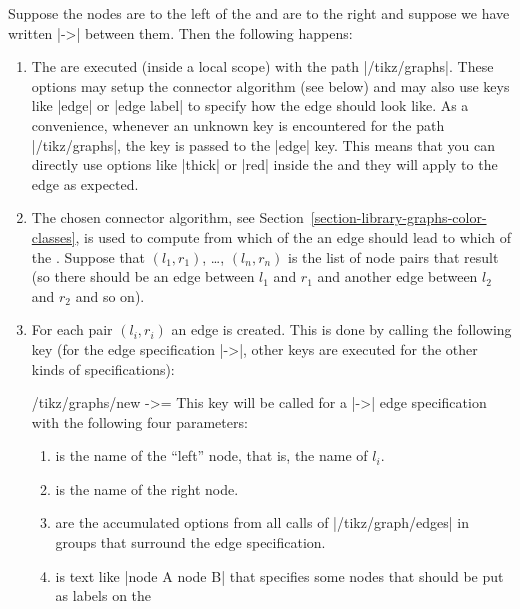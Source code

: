 Suppose the nodes  are to the left of the  and  are to the right and suppose we have
written |->| between them. Then the following happens:
%
\begin{enumerate}
    \item The  are executed (inside a local scope) with the path
        |/tikz/graphs|.  These options may setup the connector algorithm (see
        below) and may also use keys like |edge| or |edge label| to specify how
        the edge should look like. As a convenience, whenever an unknown key is
        encountered for the path |/tikz/graphs|, the key is passed to the
        |edge| key. This means that you can directly use options like |thick|
        or |red| inside the  and they will apply to the edge as
        expected.
    \item The chosen connector algorithm, see
        Section~\ref{section-library-graphs-color-classes}, is used to compute
        from which of the  an edge should lead to which of the
        . Suppose that $(l_1,r_1)$, \dots, $(l_n,r_n)$ is the
        list of node pairs that result (so there should be an edge between
        $l_1$ and $r_1$ and another edge between $l_2$ and $r_2$ and so on).
    \item For each pair $(l_i,r_i)$ an edge is created. This is done by calling
        the following key (for the edge specification |->|, other keys are
        executed for the other kinds of specifications):
        \begin{key}{/tikz/graphs/new ->=}
            This key will be called for a |->| edge specification with the
            following four parameters:
            \begin{enumerate}
                \item {} is the name of the ``left'' node, that
                    is, the name of $l_i$.
                \item {} is the name of the right node.
                \item {} are the accumulated options from all
                    calls of |/tikz/graph/edges| in groups that surround the
                    edge specification.
                \item {} is text like |node {A} node {B}| that
                    specifies some nodes that should be put as labels on the

\end{enumerate}
\end{key}
\end{enumerate}

